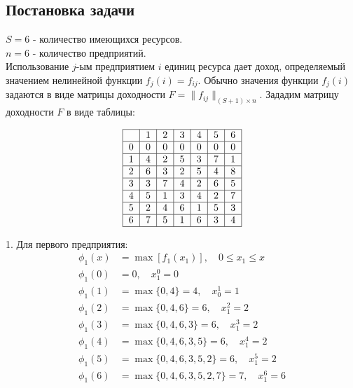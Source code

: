 \documentclass{article}
\begin{document}
\subsection{Постановка задачи}

$S = 6$ - количество имеющихся ресурсов.\\
$n = 6$ - количество предприятий.\\
Использование $j$-ым предприятием $i$ единиц
ресурса дает доход, определяемый значением нелинейной функции $f_j(i) = f_{ij}$. Обычно значения функции $f_j(i)$ задаются в виде матрицы доходности $F = \|f_{ij}\|_{(S+1) \times n}$.
Зададим матрицу доходности $F$ в виде таблицы:

\[
    \begin{tabular}{|c|c|c|c|c|c|c|}
        \hline
          & 1 & 2 & 3 & 4 & 5 & 6 \\
        \hline
        0 & 0 & 0 & 0 & 0 & 0 & 0 \\
        \hline
        1 & 4 & 2 & 5 & 3 & 7 & 1 \\
        \hline
        2 & 6 & 3 & 2 & 5 & 4 & 8 \\
        \hline
        3 & 3 & 7 & 4 & 2 & 6 & 5 \\
        \hline
        4 & 5 & 1 & 3 & 4 & 2 & 7 \\
        \hline
        5 & 2 & 4 & 6 & 1 & 5 & 3 \\
        \hline
        6 & 7 & 5 & 1 & 6 & 3 & 4 \\
        \hline
    \end{tabular}
\]

1. Для первого предприятия:
\[
    \begin{aligned}
        \phi_1(x) & = \max \left[ f_1(x_1) \right], \quad 0 \leq x_1 \leq x \\
        \phi_1(0) & = 0, \quad x_1^0 = 0                                    \\
        \phi_1(1) & = \max\{0, 4\} = 4, \quad x_0^1 = 1                     \\
        \phi_1(2) & = \max\{0, 4, 6\} = 6, \quad x_1^2 = 2                  \\
        \phi_1(3) & = \max\{0, 4, 6, 3\} = 6, \quad x_1^3 = 2               \\
        \phi_1(4) & = \max\{0, 4, 6, 3, 5\} = 6, \quad x_1^4 = 2            \\
        \phi_1(5) & = \max\{0, 4, 6, 3, 5, 2\} = 6, \quad x_1^5 = 2         \\
        \phi_1(6) & = \max\{0, 4, 6, 3, 5, 2, 7\} = 7, \quad x_1^6 = 6      \\
    \end{aligned}
\]
\end{document}
